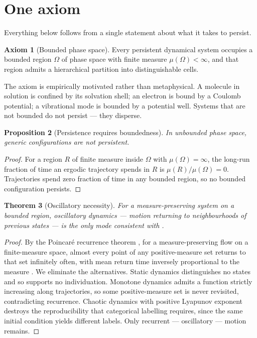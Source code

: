 \documentclass[11pt,twocolumn,a4paper]{article}
\theoremstyle{thmstyle}
\newtheorem{theorem}{Theorem}[section]
\newtheorem{proposition}[theorem]{Proposition}
\theoremstyle{definition}
\newtheorem{axiom}[theorem]{Axiom}
\theoremstyle{remark}
\begin{document}
\section{One axiom}
\label{sec:axiom}

Everything below follows from a single statement about what it takes to
persist.

\begin{axiom}[Bounded phase space]
\label{ax:bounded}
Every persistent dynamical system occupies a bounded region $\Omega$ of phase
space with finite measure $\mu(\Omega) < \infty$, and that region admits a
hierarchical partition into distinguishable cells.
\end{axiom}

The axiom is empirically motivated rather than metaphysical. A molecule in
solution is confined by its solvation shell; an electron is bound by a
Coulomb potential; a vibrational mode is bounded by a potential well. Systems
that are not bounded do not persist --- they disperse.

\begin{proposition}[Persistence requires boundedness]
\label{prop:persist}
In unbounded phase space, generic configurations are not persistent.
\end{proposition}

\begin{proof}
For a region $R$ of finite measure inside $\Omega$ with $\mu(\Omega)=\infty$,
the long-run fraction of time an ergodic trajectory spends in $R$ is
$\mu(R)/\mu(\Omega)=0$. Trajectories spend zero fraction of time in any
bounded region, so no bounded configuration persists.
\end{proof}

\begin{theorem}[Oscillatory necessity]
\label{thm:oscillatory}
For a measure-preserving system on a bounded region, oscillatory dynamics ---
motion returning to neighbourhoods of previous states --- is the only mode
consistent with .
\end{theorem}

\begin{proof}
By the Poincar\'e recurrence theorem \citep{poincare1890,walters1982}, for a
measure-preserving flow on a finite-measure space, almost every point of any
positive-measure set returns to that set infinitely often, with mean return
time inversely proportional to the measure \citep{kac1947}. We eliminate the
alternatives. Static dynamics distinguishes no states and so supports no
individuation. Monotone dynamics admits a function strictly increasing along
trajectories, so some positive-measure set is never revisited, contradicting
recurrence. Chaotic dynamics with positive Lyapunov exponent destroys the
reproducibility that categorical labelling requires, since the same initial
condition yields different labels. Only recurrent --- oscillatory --- motion
remains.
\end{proof}
\end{document}
